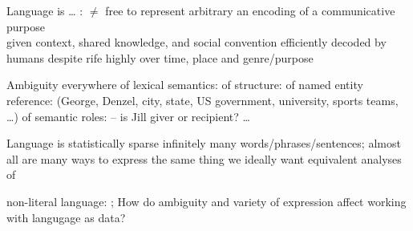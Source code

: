 \begin{points}{Language is \ldots}
	\p {}:  $\ne$ %
	\p free to represent arbitrary %
	\p an  encoding of a communicative purpose \\
	given context, shared knowledge, and social convention %
	\p efficiently decoded by humans despite rife 
	\p highly  over time, place and genre/purpose
\end{points}

\begin{points}{Ambiguity everywhere}
			\p of lexical semantics: 
			\p of structure: 
			\p of named entity reference:  (George, Denzel, city, state, US government, university, sports teams, \ldots)
			\p of semantic roles:  -- is Jill giver or recipient?
			\p \ldots
\end{points}


\begin{points}{Language is statistically sparse}
   \p infinitely many words/phrases/sentences; almost all are 
   \p many ways to express the same thing
			\p we ideally want equivalent analyses of
			\begin{itemize}
					 \p {}
					 \p {}
					 \p {}
					 \p {}
			\end{itemize}
		\p non-literal language: ; 
	\vfill
	\p How do ambiguity and variety of expression affect working with langugage as data?
\end{points}

